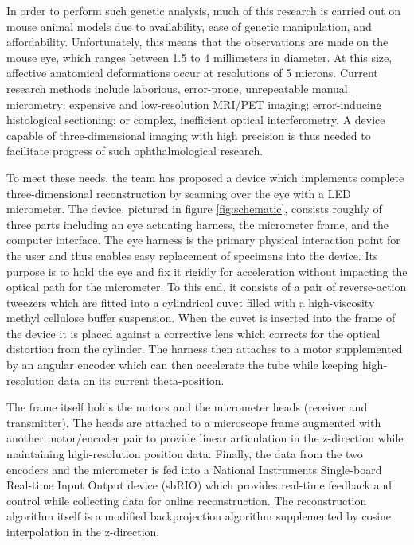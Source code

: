 \documentclass{article}
\begin{document}
In order to perform such genetic analysis, much of this research is carried out on mouse animal models due to availability, ease of genetic manipulation, and affordability\cite{schaeffel04}. Unfortunately, this means that the observations are made on the mouse eye, which ranges between 1.5 to 4 millimeters in diameter. At this size, affective anatomical deformations occur at resolutions of 5 microns. Current research methods include laborious, error-prone, unrepeatable manual micrometry\cite{wallman04}; expensive and low-resolution MRI/PET imaging\cite{atchison04}; error-inducing histological sectioning\cite{schaeffel04}; or complex, inefficient optical interferometry\cite{guggenheim04,schaeffel04}. A device capable of three-dimensional imaging with high precision is thus needed to facilitate progress of such ophthalmological research.

To meet these needs, the team has proposed a device which implements complete three-dimensional reconstruction by scanning over the eye with a LED micrometer. The device, pictured in figure \ref{fig:schematic}, consists roughly of three parts including an eye actuating harness, the micrometer frame, and the computer interface. The eye harness is the primary physical interaction point for the user and thus enables easy replacement of specimens into the device. Its purpose is to hold the eye and fix it rigidly for acceleration without impacting the optical path for the micrometer. To this end, it consists of a pair of reverse-action tweezers which are fitted into a cylindrical cuvet filled with a high-viscosity methyl cellulose buffer suspension. When the cuvet is inserted into the frame of the device it is placed against a corrective lens which corrects for the optical distortion from the cylinder. The harness then attaches to a motor supplemented by an angular encoder which can then accelerate the tube while keeping high-resolution data on its current theta-position.

The frame itself holds the motors and the micrometer heads (receiver and transmitter). The heads are attached to a microscope frame augmented with another motor/encoder pair to provide linear articulation in the z-direction while maintaining high-resolution position data. Finally, the data from the two encoders and the micrometer is fed into a National Instruments Single-board Real-time Input Output device (sbRIO) which provides real-time feedback and control while collecting data for online reconstruction. The reconstruction algorithm itself is a modified backprojection algorithm supplemented by cosine interpolation in the z-direction.
\end{document}
